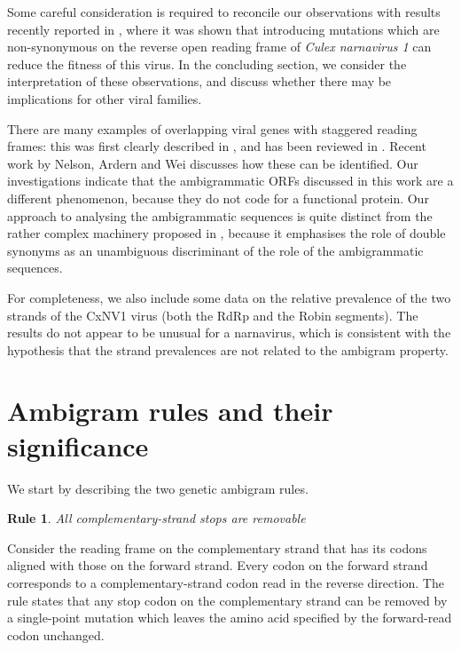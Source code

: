 \documentclass[unnumsec,webpdf,contemporary,large]{oup-authoring-template}%
\theoremstyle{thmstyleone}%
\newtheorem{ambirule}{Rule}%
\theoremstyle{thmstyletwo}%
\theoremstyle{thmstylethree}%
\begin{document}
Some careful consideration is required to reconcile our observations with results recently reported
in \cite{Ret+20}, where it was shown that introducing mutations which are non-synonymous on the reverse
open reading frame of \emph{Culex narnavirus 1} can reduce the fitness of this virus.
In the concluding section, we consider the interpretation of these observations, and discuss whether there
may be implications for other viral families.

There are many examples of overlapping viral genes with staggered reading frames: this was first
clearly described in \cite{Bar+76}, and has been reviewed in \cite{Chi+10}. Recent
work by Nelson, Ardern and Wei \citep{Nel+20} discusses how these can be identified.
Our investigations indicate that the ambigrammatic ORFs discussed in this work are a
different phenomenon, because they do not code for a functional protein.
Our approach to analysing the ambigrammatic
sequences is quite distinct from the rather complex machinery proposed in \cite{Nel+20}, because
it emphasises the role of double synonyms as an unambiguous discriminant of the role of the ambigrammatic
sequences.

For completeness, we also include some data on the relative prevalence of the two strands
of the CxNV1 virus (both the RdRp and the Robin segments). The results do not appear to be
unusual for a narnavirus, which is consistent with the hypothesis that the strand prevalences
are not related to the ambigram property.

\section{Ambigram rules and their significance}
\label{sec: 2}

We start by describing the two genetic ambigram rules.

\begin{ambirule}All complementary-strand stops are removable \label{rule1}
\end{ambirule}

Consider the reading frame on the complementary strand that has its
codons aligned with those on the forward strand. Every codon on the forward
strand corresponds to a complementary-strand codon read in the reverse
direction. The rule states that any stop codon on the complementary strand
can be removed by a single-point mutation which leaves the amino acid specified by the
forward-read codon unchanged.
\end{document}
